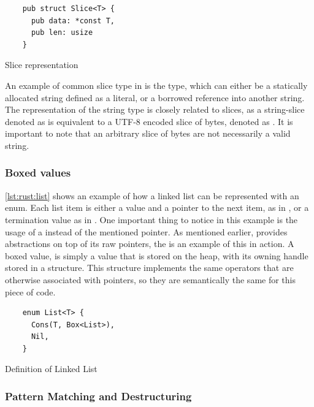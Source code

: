 \begin{listing}[H]
  \begin{verbatim}
    pub struct Slice<T> {
      pub data: *const T,
      pub len: usize
    }
\end{verbatim}
\caption{Slice representation}
\label{lst:rust:slice}
\end{listing}

An example of common slice type in {\rust} is the  type, which can either be a statically allocated string defined as a literal, or a borrowed reference into another string.
The representation of the string type is closely related to slices, as a string-slice denoted as  is equivalent to a UTF-8 encoded slice of bytes, denoted as \code{\&[u8]}.
It is important to note that an arbitrary slice of bytes are not necessarily a valid string.

\subsubsection{Boxed values}

\autoref{lst:rust:list} shows an example of how a linked list can be represented with an enum.
Each list item is either a value and a pointer to the next item, as in , or a termination value as in .
One important thing to notice in this example is the usage of a  instead of the mentioned pointer.
As mentioned earlier, {\rust} provides abstractions on top of its raw pointers, the  is an example of this in action.
A boxed value, is simply a value that is stored on the heap, with its owning handle stored in a  structure.
This structure implements the same operators that are otherwise associated with pointers, so they are semantically the same for this piece of code.

\begin{listing}[H]
  \begin{verbatim}
    enum List<T> {
      Cons(T, Box<List>),
      Nil,
    }
  \end{verbatim}
  \caption{Definition of Linked List}
  \label{lst:rust:list}
\end{listing}

\subsubsection{Pattern Matching and Destructuring}
\label{sub:pattern_matching}

